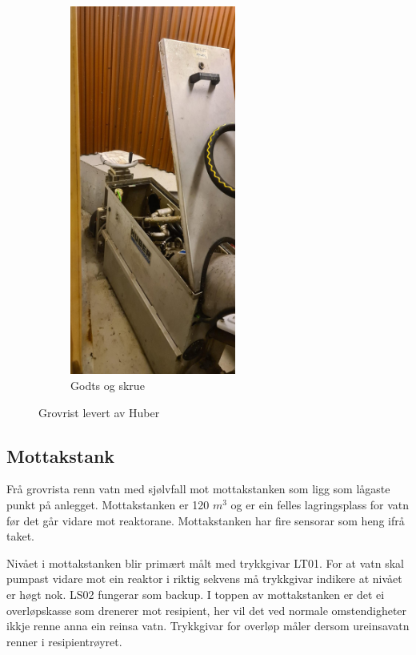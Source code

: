 \begin{figure}[htbp]
\begin{subfigure}[b]{0.3\textwidth}
        \includegraphics[angle=-90,width=0.6\textwidth]{Bilder/Huber2.JPG}
        \caption{Godts og skrue}\label{fig:Huber2}
    \end{subfigure}
    \caption{Grovrist levert av Huber}\label{fig:HuberGrovrist}
\end{figure}

\newpage
\subsection{Mottakstank}
Frå grovrista renn vatn med sjølvfall mot mottakstanken som ligg som lågaste punkt på anlegget.
Mottakstanken er 120 $m^3$ og er ein felles lagringsplass for vatn før det går vidare mot reaktorane.
Mottakstanken har fire sensorar som heng ifrå taket.

Nivået i mottakstanken blir primært målt med trykkgivar LT01. For at vatn skal pumpast vidare mot ein
reaktor i riktig sekvens må trykkgivar indikere at nivået er høgt nok. LS02 fungerar som backup. \newline
I toppen av mottakstanken er det ei overløpskasse som drenerer mot resipient, her vil det
ved normale omstendigheter ikkje renne anna ein reinsa vatn. Trykkgivar for overløp måler
dersom ureinsavatn renner i resipientrøyret.


